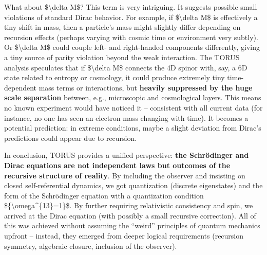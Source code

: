 \documentclass[
]{article}
\begin{document}
{What about \$\textbackslash delta M\$? This term is very intriguing. It
suggests possible small violations of standard Dirac behavior. For
example, if \$\textbackslash delta M\$ is effectively a tiny shift in
mass, then a particle's mass might slightly differ depending on
recursion effects (perhaps varying with cosmic time or environment very
subtly). Or \$\textbackslash delta M\$ could couple left- and
right-handed components differently, giving a tiny source of parity
violation beyond the weak interaction. The TORUS analysis speculates
that if \$\textbackslash delta M\$ connects the 4D spinor with, say, a
6D state related to entropy or cosmology, it could produce extremely
tiny time-dependent mass terms or interactions, but \textbf{heavily
suppressed by the huge scale separation} between, e.g., microscopic and
cosmological layers\hspace{0pt}. This means no known experiment would
have noticed it -- consistent with all current data (for instance, no
one has seen an electron mass changing with time). It becomes a
potential prediction: in extreme conditions, maybe a slight deviation
from Dirac's predictions could appear due to recursion.

In conclusion, TORUS provides a unified perspective: \textbf{the
Schrödinger and Dirac equations are not independent laws but outcomes of
the recursive structure of reality}. By including the observer and
insisting on closed self-referential dynamics, we got quantization
(discrete eigenstates) and the form of the Schrödinger equation with a
quantization condition
\$\{\textbackslash omega\^{}\{13\}=1\}\$\hspace{0pt}. By further
requiring relativistic consistency and spin, we arrived at the Dirac
equation (with possibly a small recursive correction)\hspace{0pt}. All
of this was achieved without assuming the ``weird'' principles of
quantum mechanics upfront -- instead, they emerged from deeper logical
requirements (recursion symmetry, algebraic closure, inclusion of the
observer).

}
\end{document}
